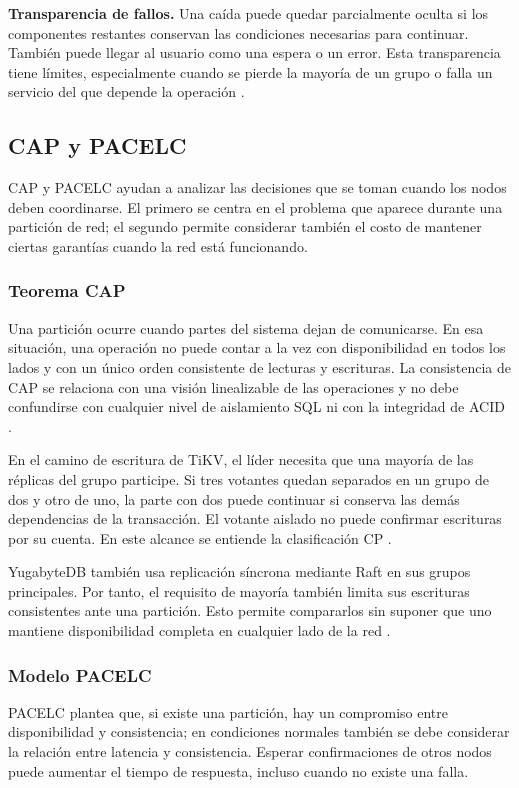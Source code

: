 \documentclass[11pt,a4paper]{article}
\begin{document}
\textbf{Transparencia de fallos.} Una caída puede quedar parcialmente oculta si los componentes restantes conservan las condiciones necesarias para continuar. También puede llegar al usuario como una espera o un error. Esta transparencia tiene límites, especialmente cuando se pierde la mayoría de un grupo o falla un servicio del que depende la operación \cite{tidb_ha,yb_repl}.

\subsection{CAP y PACELC}
CAP y PACELC ayudan a analizar las decisiones que se toman cuando los nodos deben coordinarse. El primero se centra en el problema que aparece durante una partición de red; el segundo permite considerar también el costo de mantener ciertas garantías cuando la red está funcionando.

\subsubsection{Teorema CAP}
Una partición ocurre cuando partes del sistema dejan de comunicarse. En esa situación, una operación no puede contar a la vez con disponibilidad en todos los lados y con un único orden consistente de lecturas y escrituras. La consistencia de CAP se relaciona con una visión linealizable de las operaciones y no debe confundirse con cualquier nivel de aislamiento SQL ni con la integridad de ACID \cite{huang2024survey}.

En el camino de escritura de TiKV, el líder necesita que una mayoría de las réplicas del grupo participe. Si tres votantes quedan separados en un grupo de dos y otro de uno, la parte con dos puede continuar si conserva las demás dependencias de la transacción. El votante aislado no puede confirmar escrituras por su cuenta. En este alcance se entiende la clasificación CP \cite{tidb_storage,tidb_ha}.

YugabyteDB también usa replicación síncrona mediante Raft en sus grupos principales. Por tanto, el requisito de mayoría también limita sus escrituras consistentes ante una partición. Esto permite compararlos sin suponer que uno mantiene disponibilidad completa en cualquier lado de la red \cite{yb_repl}.

\subsubsection{Modelo PACELC}
PACELC plantea que, si existe una partición, hay un compromiso entre disponibilidad y consistencia; en condiciones normales también se debe considerar la relación entre latencia y consistencia. Esperar confirmaciones de otros nodos puede aumentar el tiempo de respuesta, incluso cuando no existe una falla.
\end{document}

